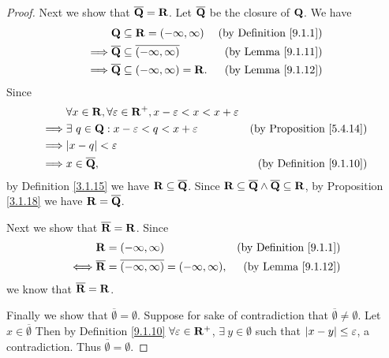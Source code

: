 \begin{proof}
    Next we show that \(\overline{\mathbf{Q}} = \mathbf{R}\).
    Let \(\overline{\mathbf{Q}}\) be the closure of \(\mathbf{Q}\).
    We have
    \begin{align*}
                 & \mathbf{Q} \subseteq \mathbf{R} = (-\infty, \infty)                  & \text{(by Definition \ref{9.1.1})} \\
        \implies & \overline{\mathbf{Q}} \subseteq \overline{(-\infty, \infty)} & \text{(by Lemma \ref{9.1.11})}     \\
        \implies & \overline{\mathbf{Q}} \subseteq (-\infty, \infty) = \mathbf{R}.      & \text{(by Lemma \ref{9.1.12})}
    \end{align*}
    Since
    \begin{align*}
                 & \forall x \in \R, \forall \varepsilon \in \R^+, x - \varepsilon < x < x + \varepsilon                                        \\
        \implies & \exists\ q \in \Q : x - \varepsilon < q < x + \varepsilon                             & \text{(by Proposition \ref{5.4.14})} \\
        \implies & \abs{x - q} < \varepsilon                                                                                                    \\
        \implies & x \in \overline{\Q},                                                                  & \text{(by Definition \ref{9.1.10})}
    \end{align*}
    by Definition \ref{3.1.15} we have \(\mathbf{R} \subseteq \overline{\mathbf{Q}}\).
    Since \(\mathbf{R} \subseteq \overline{\mathbf{Q}} \land \overline{\mathbf{Q}} \subseteq \mathbf{R}\), by Proposition \ref{3.1.18} we have \(\mathbf{R} = \overline{\mathbf{Q}}\).

    Next we show that \(\overline{\mathbf{R}} = \mathbf{R}\).
    Since
    \begin{align*}
             & \mathbf{R} = (-\infty, \infty)                                            & \text{(by Definition \ref{9.1.1})} \\
        \iff & \overline{\mathbf{R}} = \overline{(-\infty, \infty)} = (-\infty, \infty), & \text{(by Lemma \ref{9.1.12})}
    \end{align*}
    we know that \(\overline{\mathbf{R}} = \mathbf{R}\).

    Finally we show that \(\overline{\emptyset} = \emptyset\).
    Suppose for sake of contradiction that \(\overline{\emptyset} \neq \emptyset\).
    Let \(x \in \overline{\emptyset}\)
    Then by Definition \ref{9.1.10} \(\forall \varepsilon \in \mathbf{R}^+\), \(\exists\ y \in \emptyset\) such that \(\left\lvert x - y\right\rvert \leq \varepsilon\), a contradiction.
    Thus \(\overline{\emptyset} = \emptyset\).
\end{proof}

